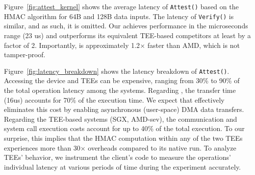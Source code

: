 Figure~\ref{fig:attest_kernel} shows the average latency of {\tt Attest()} based on the HMAC algorithm for 64B and 128B data inputs. The latency of {\tt Verify()} is similar, and as such, it is omitted. Our \projecttitle{} achieves performance in the microseconds range (23 us) and outperforms its equivalent TEE-based competitors at least by a factor of 2. Importantly, \projecttitle{} is approximately 1.2$\times$ faster than AMD, which is not tamper-proof. 

Figure~\ref{fig:latency_breakdown} shows the latency breakdown of {\tt Attest()}. Accessing the \projecttitle{} device and TEEs can be expensive, ranging from 30\% to 90\% of the total operation latency among the systems. 
Regarding \projecttitle{}, the transfer time (16us) accounts for 70\% of the execution time. We expect that \projecttitle{} effectively eliminates this cost by enabling asynchronous (user-space) DMA data transfers. 
% 
Regarding the TEE-based systems (SGX, AMD-sev), the communication and system call execution costs account for up to 40\% of the total execution. To our surprise, this implies that the HMAC computation within any of the two TEEs experiences more than 30$\times$ overheads compared to its native run. To analyze TEEs' behavior, we instrument the client's code to measure the operations' individual latency at various periods of time during the experiment accurately. 

